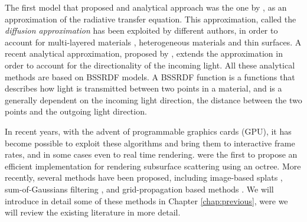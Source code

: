 The first model that proposed and analytical approach was the one by \cite{Jensen:2001:PMS:383259.383319}, as an approximation of the radiative transfer equation. This approximation, called the \emph{diffusion approximation} \citep{books/daglib/0093591} has been exploited by different authors, in order to account for multi-layered materials \citep{Donner:2005:LDM:1186822.1073308}, heterogeneous materials \citep{journals/cgf/WangWHSYG10} and thin surfaces\citep{journals/cgf/WangWHSYG10}. A recent analytical approximation, proposed by \cite{IMM2013-06646}, extends the approximation in order to account for the directionality of the incoming light. All these analytical methods are based on BSSRDF models. A BSSRDF function is a functions that describes how light is transmitted between two points in a material, and is a generally dependent on the incoming light direction, the distance between the two points and the outgoing light direction.

In recent years, with the advent of programmable graphics cards (GPU), it has become possible to exploit these algorithms and bring them to interactive frame rates, and in some cases even to real time rendering. \cite{Jensen:2002:RHR:566654.566619} were the first to propose an efficient implementation for rendering subsurface scattering using an octree. More recently, several methods have been proposed, including image-based splats \citep{4736459}, sum-of-Gaussians filtering \citep{d'Eon:2007:ERH:2383847.2383869}, and grid-propagation based methods \citep{Borlum:2011:SSL:2018323.2018325}. We will introduce in detail some of these methods in Chapter \ref{chap:previous}, were we will review the existing literature in more detail.

